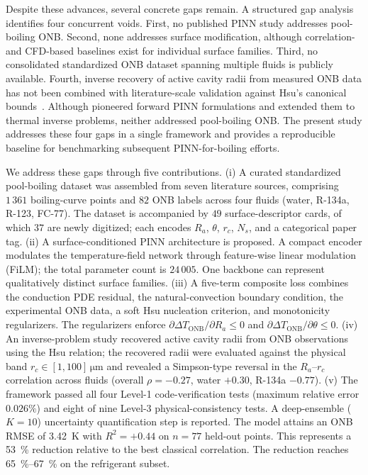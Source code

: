 Despite these advances, several concrete gaps remain.
A structured gap analysis identifies four concurrent voids. First, no
published PINN study addresses pool-boiling ONB. Second, none addresses
surface modification, although correlation- and CFD-based baselines
exist for individual surface families. Third, no consolidated
standardized ONB dataset spanning multiple fluids is publicly
available. Fourth, inverse recovery of active cavity radii from
measured ONB data has not been combined with literature-scale
validation against Hsu's canonical bounds~\citep{hsu1962}. Although
\citet{raissi2019} pioneered forward PINN formulations and
\citet{cai2021} extended them to thermal inverse problems, neither
addressed pool-boiling ONB. The present study addresses these four gaps
in a single framework and provides a reproducible baseline for
benchmarking subsequent PINN-for-boiling efforts.

We address these gaps through five contributions.
(i) A curated standardized pool-boiling dataset was assembled from
seven literature sources, comprising $1\,361$ boiling-curve points and
$82$ ONB labels across four fluids (water, R-134a, R-123, FC-77). The
dataset is accompanied by $49$ surface-descriptor cards, of which $37$
are newly digitized; each encodes $R_a$, $\theta$, $r_c$, $N_s$, and a
categorical paper tag.
(ii) A surface-conditioned PINN architecture is proposed. A compact
encoder modulates the temperature-field network through feature-wise
linear modulation (FiLM); the total parameter count is $24\,005$.
One backbone can represent qualitatively distinct surface families.
(iii) A five-term composite loss combines the conduction PDE residual,
the natural-convection boundary condition, the experimental ONB data,
a soft Hsu nucleation criterion, and monotonicity regularizers. The
regularizers enforce
$\partial \Delta T_{\mathrm{ONB}}/\partial R_a \le 0$ and
$\partial \Delta T_{\mathrm{ONB}}/\partial \theta \le 0$.
(iv) An inverse-problem study recovered active cavity radii from ONB
observations using the Hsu relation; the recovered radii were evaluated
against the physical band $r_c \in [1,100]\,\si{\micro\meter}$ and
revealed a Simpson-type reversal in the $R_a$--$r_c$ correlation
across fluids (overall $\rho=-0.27$, water $+0.30$, R-134a $-0.77$).
(v) The framework passed all four Level-1 code-verification tests
(maximum relative error $0.026\%$) and eight of nine Level-3
physical-consistency tests. A deep-ensemble ($K=10$) uncertainty
quantification step is reported. The model attains an ONB RMSE of
\SI{3.42}{K} with $R^2 = +0.44$ on $n=77$ held-out points. This
represents a \SI{53}{\percent} reduction relative to the best classical
correlation. The reduction reaches \SIrange{65}{67}{\percent} on the
refrigerant subset.

